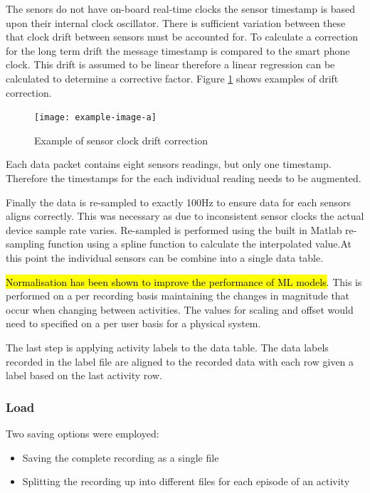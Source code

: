 The senors do not have on-board real-time clocks the sensor timestamp is based upon their internal clock oscillator. There is sufficient variation between these that clock drift between sensors must be accounted for. To calculate a correction for the long term drift the message timestamp is compared to the smart phone clock. This drift is assumed to be linear therefore a linear regression can be calculated to determine a corrective factor. Figure \ref{fig:methods-clock-drift-correction} shows examples of drift correction. %

\begin{figure}[!hbt]
    \centering
    \texttt{[image: example-image-a]}
    \caption{Example of sensor clock drift correction}
    \label{fig:methods-clock-drift-correction}
\end{figure}

Each data packet contains eight sensors readings, but only one timestamp. Therefore the timestamps for the each individual reading needs to be augmented.

Finally the data is re-sampled to exactly 100Hz to ensure data for each sensors aligns correctly. This was necessary as due to inconsistent sensor clocks the actual device sample rate varies. Re-sampled is performed using the built in Matlab re-sampling function using a spline function to calculate the interpolated value.At this point the individual sensors can be combine into a single data table.

\hl{Normalisation has been shown to improve the performance of ML models}. \cite{} %
This is performed on a per recording basis maintaining the changes in magnitude that occur when changing between activities. The values for scaling and offset would need to specified on a per user basis for a physical system.

The last step is applying activity labels to the data table. The data labels recorded in the label file are aligned to the recorded data with each row given a label based on the last activity row.

\subsubsection{Load}
Two saving options were employed:
\begin{itemize}
    \item Saving the complete recording as a single file
    \item Splitting the recording up into different files for each episode of an activity
\end{itemize}

